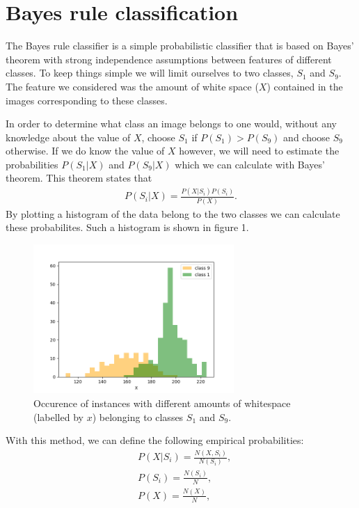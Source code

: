 \documentclass[11pt]{article}
\begin{document}
\section{Bayes rule classification}
The Bayes rule classifier is a simple probabilistic classifier that is based on Bayes' theorem with strong independence assumptions between features of different classes. To keep things simple we will limit ourselves to two classes, $S_1$ and $S_9$. The feature we considered was the amount of white space ($X$) contained in the images corresponding to these classes.\par
In order to determine what class an image belongs to one would, without any knowledge about the value of $X$, choose $S_1$ if $P(S_1)>P(S_9)$ and choose $S_9$ otherwise. If we do know the value of $X$ however, we will need to estimate the probabilities $P(S_1|X)$ and $P(S_9|X)$ which we can calculate with Bayes' theorem. This theorem states that
\begin{align}
P(S_i|X)=\frac{P(X|S_i)P(S_i)}{P(X)}.
\end{align}
By plotting a histogram of the data belong to the two classes we can calculate these probabilites. Such a histogram is shown in figure 1.
\begin{figure}[!b]
\centering
\includegraphics[width=0.68\textwidth]{histogram1_9.png}
\caption{Occurence of instances with different amounts of whitespace (labelled by $x$) belonging to classes $S_1$ and $S_9$.}
\end{figure}
With this method, we can define the following empirical probabilities:\vspace*{2mm}
\begin{align}
&P(X|S_i)=\frac{N(X, S_i)}{N(S_i)},\\[2mm]
&P(S_i)=\frac{N(S_i)}{N},\\[2mm]
&P(X)=\frac{N(X)}{N},
\end{align}
\end{document}

